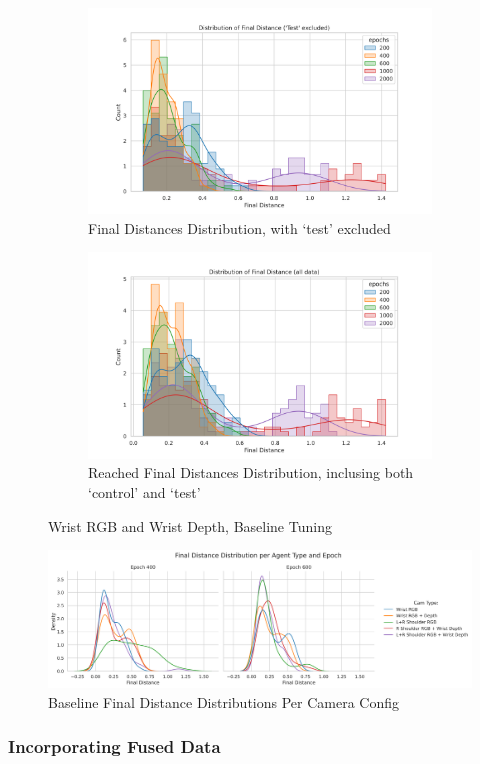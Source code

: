 \begin{figure}[H]
  \centering
  \begin{subfigure}{0.45\linewidth}
    \centering
    \includegraphics[width=\linewidth]{assets/evaluation/rnn/wd-epoch-test-final.png}
    \caption{Final Distances Distribution, with `test' excluded}\label{subfig:rnn-grasp-final}
  \end{subfigure}
  \hfill
  \begin{subfigure}{0.45\linewidth}
    \centering
    \includegraphics[width=\linewidth]{assets/evaluation/rnn/wdw-epoch-test-all-final.png}
    \caption{Reached Final Distances Distribution, inclusing both `control' and `test'}\label{subfig:rnn-grasp-final}
  \end{subfigure}
  \caption{Wrist RGB and Wrist Depth, Baseline Tuning}\label{fig:rnn-grasp-final-wd}
\end{figure}

\begin{figure}[H]
  \centering
  \includegraphics[width=0.8\linewidth]{assets/evaluation/rnn/400-600-cams.png}
  \caption{Baseline Final Distance Distributions Per Camera Config }\label{fig:rnn-grasp-tuning}
\end{figure}

\subsubsection{Incorporating Fused Data}

